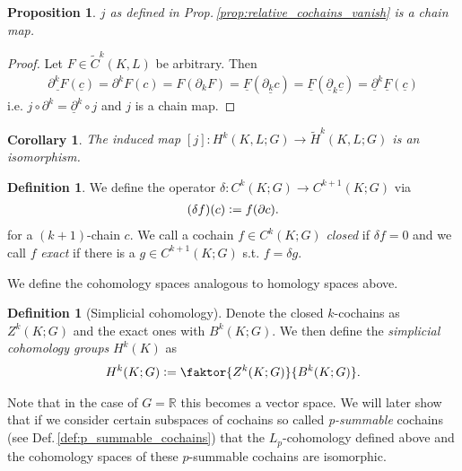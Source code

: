 \documentclass[12pt,a4paper]{article}
\numberwithin{equation}{subsection}
\numberwithin{lemma}{subsection}
\newtheorem{corollary}[lemma]{Corollary}
\newtheorem{proposition}[lemma]{Proposition}
\theoremstyle{definition}
\newtheorem{definition}[lemma]{Definition}
\newcommand{\real}{\mathbb{R}}
\begin{document}
\begin{proposition}
    $j$ as defined in Prop.\,\ref{prop:relative_cochains_vanish} is a chain 
    map.
\end{proposition}
\begin{proof}
    Let $F \in \tilde{C}^k(K,L)$ be arbitrary. Then
    \begin{align*}
        \underline{\partial^k F}(\underline{c})
        = \partial^k F (c) = F(\partial_k F) 
        = \underline{F}(\underline{\partial_k c})
        = \underline{F}(\underline{\partial}_k \underline{c})
        = \underline{\partial}^k \underline{F} (\underline{c})
    \end{align*}
    i.e. $j \circ \partial^k = \underline{\partial}^k\circ j$ and $j$ is a 
    chain map.
\end{proof}

\begin{corollary}
    The induced map $[j]: H^k(K,L;G) \rightarrow \tilde{H}^k(K,L;G)$ is an 
    isomorphism.
\end{corollary}

\begin{definition}
    We define the operator $\delta: C^k(K;G) \rightarrow C^{k+1}(K;G)$ via
    \begin{align*}
        (\delta f) (c) \vcentcolon= f(\partial c).
    \end{align*}
    for a $(k+1)$-chain $c$.
    We call a cochain $f \in C^k(K;G)$ \textit{closed} if $\delta f = 0$ 
    and we call $f$
    \textit{exact} if there is a $g \in C^{k+1}(K;G)$ s.t. $f = \delta g$.
\end{definition}
\noindent We define the cohomology spaces analogous to homology spaces above.
\begin{definition}[Simplicial cohomology]
    Denote the closed $k$-cochains as $Z^k(K;G)$ and the 
    exact ones with $B^k(K;G)$. 
    We then define the \textit{simplicial cohomology groups}
    $H^k(K)$ as
    \begin{align*}
        H^k(K;G) \vcentcolon= \faktor{Z^k(K;G)}{B^k(K;G)}.
    \end{align*}
\end{definition}
Note that in the case of $G = \real$ this becomes a vector space.
We will later show that if we consider certain subspaces of cochains so called
\textit{p-summable} cochains (see Def.\,\ref{def:p_summable_cochains}) 
that the $L_p$-cohomology defined above and the
cohomology spaces of these $p$-summable cochains are isomorphic.
\end{document}
